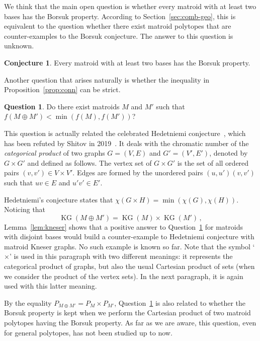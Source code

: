 \documentclass[12pt]{amsart}
\theoremstyle{plain}
\theoremstyle{definition}
\newtheorem{conjecture}[theorem]{Conjecture}
\newtheorem{question}[theorem]{Question}
\theoremstyle{remark}
\def \KG {\operatorname{KG}}
\begin{document}
We think that the main open question is whether every matroid with at least two bases has the Borsuk property. According to Section~\ref{sec:comb-geo}, this is equivalent to the question whether there exist matroid polytopes that are counter-examples to the Borsuk conjecture. The answer to this question is unknown.

\begin{conjecture}\label{conj:main}
Every matroid with at least two bases has the Borsuk property.
\end{conjecture}

Another question that arises naturally is whether the inequality in Proposition~\ref{prop:conn} can be strict.

\begin{question}\label{quest:hedet}
Do there exist matroids $M$ and $M'$ such that $f(M \oplus M') < \min(f(M),f(M'))$?
\end{question}

This question is actually related the celebrated Hedetniemi conjecture~\cite{hedetniemi1966homomorphisms}, which has been refuted by Shitov in 2019~\cite{shitov2019counterexamples}. It deals with the chromatic number of the {\em categorical product} of two graphs $G=(V,E)$ and $G'=(V',E')$, denoted by $G \times G'$ and defined as follows. The vertex set of $G \times G'$ is the set of all ordered pairs $(v,v') \in V \times V'$. Edges are formed by the unordered pairs $(u,u')(v,v')$ such that $uv \in E$ and $u'v' \in E'$.

Hedetniemi's conjecture states that $\chi(G \times H) = \min(\chi(G),\chi(H))$. Noticing that
\[
\KG(M \oplus M') = \KG(M) \times \KG(M') \, ,
\] Lemma~\ref{lem:kneser} shows that a positive answer to Question~\ref{quest:hedet} for matroids with disjoint bases would build a counter-example to Hedetniemi conjecture with matroid Kneser graphs. No such example is known so far. Note that the symbol `$\times$' is used in this paragraph with two different meanings: it represents the categorical product of graphs, but also the usual Cartesian product of sets (when we consider the product of the vertex sets). In the next paragraph, it is again used with this latter meaning.

By the equality $P_{M \oplus M'} = P_M \times P_{M'}$, Question~\ref{quest:hedet} is also related to whether the Borsuk property is kept when we perform the Cartesian product of two matroid polytopes having the Borsuk property. As far as we are aware, this question, even for general polytopes, has not been studied up to now.




\end{document}
